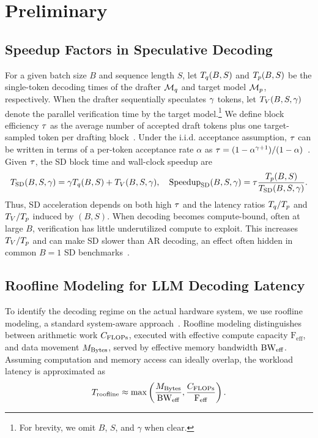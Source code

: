\section{Preliminary}
\label{sec:preliminary}

\subsection{Speedup Factors in Speculative Decoding}
\label{subsec:sd}

For a given batch size $B$ and sequence length $S$, let $T_q(B,S)$ and $T_p(B,S)$ be the single-token decoding times of the drafter $\mathcal{M}_{q}$ and target model $\mathcal{M}_{p}$, respectively.
When the drafter sequentially speculates $\gamma$ tokens, let $T_V(B,S,\gamma)$ denote the parallel verification time by the target model.\footnote{For brevity, we omit $B$, $S$, and $\gamma$ when clear.}
We define block efficiency $\tau$ as the average number of accepted draft tokens plus one target-sampled token per drafting block~\citep{zhou2024distillspec}.
Under the i.i.d. acceptance assumption, $\tau$ can be written in terms of a per-token acceptance rate $\alpha$ as
$\tau=(1-\alpha^{\gamma+1})/(1-\alpha)$~\citep{leviathan2023fast,sadhukhan2024magicdec}.
Given $\tau$, the SD block time and wall-clock speedup are
\begin{equation}
T_{\mathrm{SD}}(B,S,\gamma)
=
\gamma T_q(B,S) + T_V(B,S,\gamma),
\quad
\mathrm{Speedup}_{\mathrm{SD}}(B,S,\gamma)
=
\tau \frac{T_p(B,S)}
{T_{\mathrm{SD}}(B,S,\gamma)}.
\label{eq:sd_speedup}
\end{equation}
Thus, SD acceleration depends on both high $\tau$ and the latency ratios
$T_q/T_p$ and $T_V/T_p$ induced by $(B,S)$.
When decoding becomes compute-bound, often at large $B$, verification has little underutilized compute to exploit.
This increases $T_V/T_p$ and can make SD slower than AR decoding, an effect often hidden in common $B=1$ SD benchmarks~\citep{sadhukhan2024magicdec,xia2024unlocking}.


\subsection{Roofline Modeling for LLM Decoding Latency}
\label{subsec:roofline-latency}
To identify the decoding regime on the actual hardware system, we use roofline modeling, a standard system-aware approach~\citep{williams2009roofline,yuan2024llm}.
Roofline modeling distinguishes between arithmetic work $C_{\mathrm{FLOPs}}$, executed with effective compute capacity $\mathrm{F}_{\mathrm{eff}}$, and data movement $M_{\mathrm{Bytes}}$, served by effective memory bandwidth $\mathrm{BW}_{\mathrm{eff}}$.
Assuming computation and memory access can ideally overlap, the workload latency is approximated as
\begin{equation}
T_{\mathrm{roofline}}
\approx
\max\left(
\frac{M_{\mathrm{Bytes}}}{\mathrm{BW}_{\mathrm{eff}}},
\frac{C_{\mathrm{FLOPs}}}{\mathrm{F}_{\mathrm{eff}}}
\right).
\label{eq:roofline_basic}
\end{equation}

